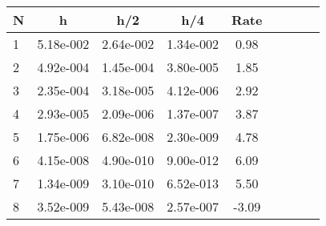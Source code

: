 \begin{tabular}{lcccccccc}
N & h & h/2 & h/4 & Rate\\
\hline
1& 5.18e-002& 2.64e-002& 1.34e-002& 0.98\\
2& 4.92e-004& 1.45e-004& 3.80e-005& 1.85\\
3& 2.35e-004& 3.18e-005& 4.12e-006& 2.92\\
4& 2.93e-005& 2.09e-006& 1.37e-007& 3.87\\
5& 1.75e-006& 6.82e-008& 2.30e-009& 4.78\\
6& 4.15e-008& 4.90e-010& 9.00e-012& 6.09\\
7& 1.34e-009& 3.10e-010& 6.52e-013& 5.50\\
8& 3.52e-009& 5.43e-008& 2.57e-007& -3.09\\
\hline
\end{tabular}
